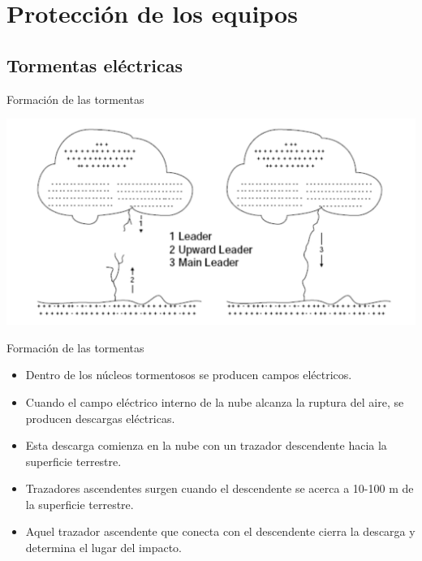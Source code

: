 \documentclass[xcolor={usenames,svgnames,dvipsnames}]{beamer}
\begin{document}
\section{Protección de los equipos}
\label{sec:org87b1a9f}

\subsection{Tormentas eléctricas}
\label{sec:org3e0f6d8}

\begin{frame}[label={sec:org4d9a916}]{Formación de las tormentas}
\begin{center}
\includegraphics[width=.9\linewidth]{../figs/FormacionTormenta.pdf}
\end{center}
\end{frame}

\begin{frame}[label={sec:orgafb1827}]{Formación de las tormentas}
\begin{itemize}
\item Dentro de los núcleos tormentosos se producen campos eléctricos.

\item Cuando el campo eléctrico interno de la nube alcanza la ruptura del
aire, se producen descargas eléctricas.

\item \alert{Esta descarga comienza en la nube} con un \alert{trazador descendente} hacia
la superficie terrestre.

\item Trazadores ascendentes surgen cuando el descendente se acerca a
10-100 m de la superficie terrestre.

\item Aquel trazador ascendente que conecta con el descendente cierra la
descarga y determina el lugar del impacto.
\end{itemize}
\end{frame}
\end{document}
